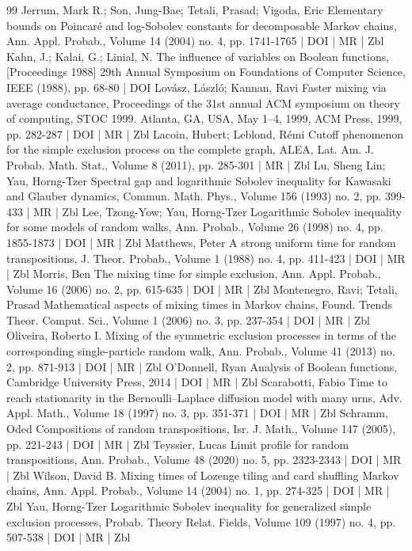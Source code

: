 \documentclass[10pt]{amsart}
\theoremstyle{definition}\newtheorem{defi}[theo]{Definition}\newtheorem{rema}[theo]{Remark}\newtheorem{exam}[theo]{Example}\newtheorem{exem}[theo]{Example}\newtheorem{nota}[theo]{Notation}
\begin{document}
\begin{thebibliography}{99}
Jerrum, Mark R.; Son, Jung-Bae; Tetali, Prasad; Vigoda, Eric Elementary bounds on Poincaré and log-Sobolev constants for decomposable Markov chains, Ann. Appl. Probab., Volume 14 (2004) no. 4, pp. 1741-1765 | DOI | MR | Zbl
Kahn, J.; Kalai, G.; Linial, N. The influence of variables on Boolean functions, [Proceedings 1988] 29th Annual Symposium on Foundations of Computer Science, IEEE (1988), pp. 68-80 | DOI
Lovász, László; Kannan, Ravi Faster mixing via average conductance, Proceedings of the 31st annual ACM symposium on theory of computing, STOC 1999. Atlanta, GA, USA, May 1–4, 1999, ACM Press, 1999, pp. 282-287 | DOI | MR | Zbl
Lacoin, Hubert; Leblond, Rémi Cutoff phenomenon for the simple exclusion process on the complete graph, ALEA, Lat. Am. J. Probab. Math. Stat., Volume 8 (2011), pp. 285-301 | MR | Zbl
Lu, Sheng Lin; Yau, Horng-Tzer Spectral gap and logarithmic Sobolev inequality for Kawasaki and Glauber dynamics, Commun. Math. Phys., Volume 156 (1993) no. 2, pp. 399-433 | MR | Zbl
Lee, Tzong-Yow; Yau, Horng-Tzer Logarithmic Sobolev inequality for some models of random walks, Ann. Probab., Volume 26 (1998) no. 4, pp. 1855-1873 | DOI | MR | Zbl
Matthews, Peter A strong uniform time for random transpositions, J. Theor. Probab., Volume 1 (1988) no. 4, pp. 411-423 | DOI | MR | Zbl
Morris, Ben The mixing time for simple exclusion, Ann. Appl. Probab., Volume 16 (2006) no. 2, pp. 615-635 | DOI | MR | Zbl
Montenegro, Ravi; Tetali, Prasad Mathematical aspects of mixing times in Markov chains, Found. Trends Theor. Comput. Sci., Volume 1 (2006) no. 3, pp. 237-354 | DOI | MR | Zbl
Oliveira, Roberto I. Mixing of the symmetric exclusion processes in terms of the corresponding single-particle random walk, Ann. Probab., Volume 41 (2013) no. 2, pp. 871-913 | DOI | MR | Zbl
O’Donnell, Ryan Analysis of Boolean functions, Cambridge University Press, 2014 | DOI | MR | Zbl
Scarabotti, Fabio Time to reach stationarity in the Bernoulli–Laplace diffusion model with many urns, Adv. Appl. Math., Volume 18 (1997) no. 3, pp. 351-371 | DOI | MR | Zbl
Schramm, Oded Compositions of random transpositions, Isr. J. Math., Volume 147 (2005), pp. 221-243 | DOI | MR | Zbl
Teyssier, Lucas Limit profile for random transpositions, Ann. Probab., Volume 48 (2020) no. 5, pp. 2323-2343 | DOI | MR | Zbl
Wilson, David B. Mixing times of Lozenge tiling and card shuffling Markov chains, Ann. Appl. Probab., Volume 14 (2004) no. 1, pp. 274-325 | DOI | MR | Zbl
Yau, Horng-Tzer Logarithmic Sobolev inequality for generalized simple exclusion processes, Probab. Theory Relat. Fields, Volume 109 (1997) no. 4, pp. 507-538 | DOI | MR | Zbl
\end{thebibliography}
\end{document}
